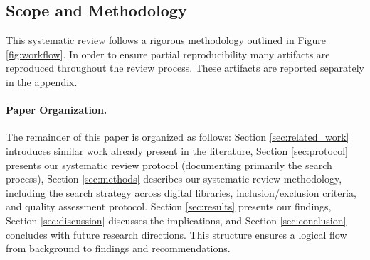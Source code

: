 
\subsection{Scope and Methodology}
This systematic review follows a rigorous methodology outlined in Figure \ref{fig:workflow}. In
order to ensure partial reproducibility many artifacts are reproduced throughout the review
process. These artifacts are reported separately in the appendix.


\paragraph{Paper Organization.}
The remainder of this paper is organized as follows: Section \ref{sec:related_work} introduces
similar work already present in the literature, Section \ref{sec:protocol} presents our systematic
review protocol (documenting primarily the search process), Section \ref{sec:methods} describes our
systematic review methodology, including the search strategy across digital libraries,
inclusion/exclusion criteria, and quality assessment protocol. Section \ref{sec:results} presents
our findings, Section \ref{sec:discussion} discusses the implications, and Section
\ref{sec:conclusion} concludes with future research directions. This structure ensures a logical
flow from background to findings and recommendations. 